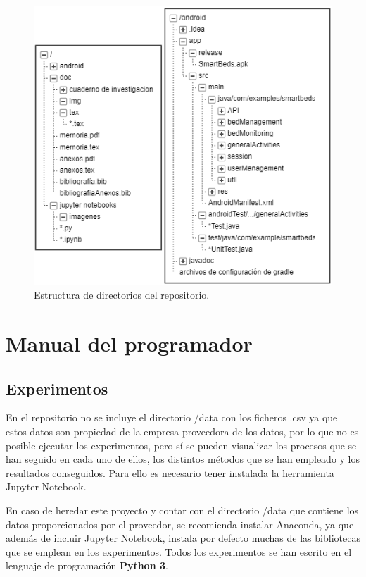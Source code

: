 \begin{figure}
	\centering
	\includegraphics[width=1\textwidth]{../img/directorios.png}
	\caption{Estructura de directorios del repositorio.}
	\label{fig:directorios}
\end{figure}

\section{Manual del programador}

\subsection{Experimentos} 

En el repositorio no se incluye el directorio /data con los ficheros .csv ya que estos datos son propiedad de la empresa proveedora de los datos, por lo que no es posible ejecutar los experimentos, pero sí se pueden visualizar los procesos que se han seguido en cada uno de ellos, los distintos métodos que se han empleado y los resultados conseguidos. Para ello es necesario tener instalada la herramienta Jupyter Notebook. 

En caso de heredar este proyecto y contar con el directorio /data que contiene los datos proporcionados por el proveedor, se recomienda instalar Anaconda, ya que además de incluir Jupyter Notebook, instala por defecto muchas de las bibliotecas que se emplean en los experimentos. Todos los experimentos se han escrito en el lenguaje de programación \textbf{Python 3}. 

